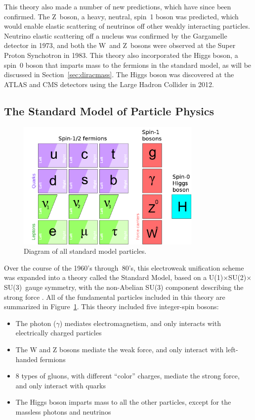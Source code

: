 \documentclass[/main.tex]{subfiles}
\begin{document}
This theory also made a number of new predictions, which have since been confirmed.
The Z~boson, a heavy, neutral, spin~1 boson was predicted, which would enable elastic scattering of neutrinos off other weakly interacting particles.
Neutrino elastic scattering off a nucleus was confirmed by the Gargamelle detector in 1973\cite{Gargamelle1973}, and both the W~and Z~bosons were observed at the Super Proton Synchotron in 1983\cite{Arnison1983, Bagnaia1983}.
This theory also incorporated the Higgs boson, a spin~0 boson that imparts mass to the fermions in the standard model, as will be discussed in Section~\ref{sec:diracmass}.
The Higgs boson was discovered at the ATLAS and CMS detectors using the Large Hadron Collider in 2012\cite{ATLAS2012, CMS2012}.

\subsection{The Standard Model of Particle Physics} \label{sec:SM}
\begin{figure}[t]
  \centering
  \includegraphics[width=0.8\textwidth]{SM}
  \caption[Standard Model Particles]{\label{fig:SM}
    Diagram of all standard model particles.
  }
\end{figure}
Over the course of the 1960's through~80's, this electroweak unification scheme was expanded into a theory called the Standard Model, based on a U(1)$\times$SU(2)$\times$SU(3)~gauge symmetry, with the non-Abelian SU(3) component describing the strong force \cite{PDG2018}.
All of the fundamental particles included in this theory are summarized in Figure~\ref{fig:SM}.
This theory included five integer-spin bosons:
\begin{itemize}
\item The photon ($\gamma$) mediates electromagnetism, and only interacts with electrically charged particles
\item The W and Z bosons mediate the weak force, and only interact with left-handed fermions
\item 8 types of gluons, with different ``color'' charges, mediate the strong force, and only interact with quarks
\item The Higgs boson imparts mass to all the other particles, except for the massless photons and neutrinos
\end{itemize}
\end{document}
